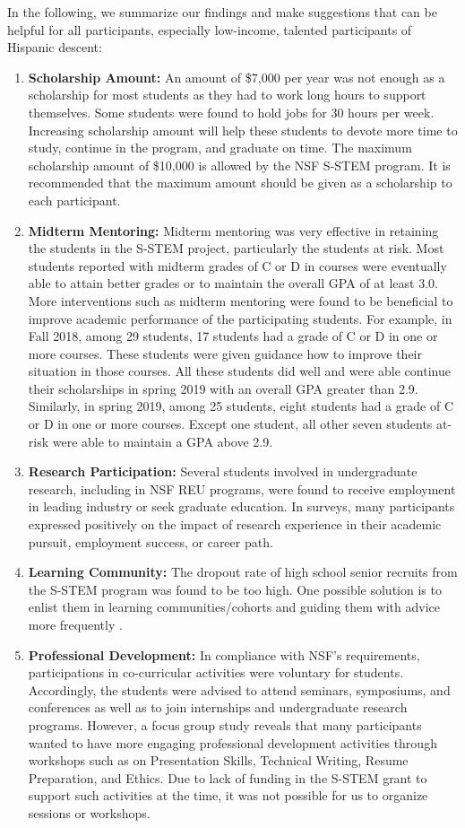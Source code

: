 \documentclass{article}
\begin{document}
In the following, we summarize our findings and make suggestions that can be helpful for all participants, especially low-income, talented participants of Hispanic descent: 
\begin{enumerate}
\item \textbf{Scholarship Amount:} An amount of \$7,000 per year was not enough as a scholarship for most students as they had to work long hours to support themselves. Some students were found to hold jobs for 30 hours per week. Increasing scholarship amount will help these students to devote more time to study, continue in the program, and graduate on time. The maximum scholarship amount of \$10,000 is allowed by the NSF S-STEM program. It is recommended that the maximum amount should be given as a scholarship to each participant.  
\item \textbf{Midterm Mentoring:} Midterm mentoring was very effective in retaining the students in the S-STEM project, particularly the students at risk. Most students reported with midterm grades of C or D in courses were eventually able to attain better grades or to maintain the overall GPA of at least 3.0. More interventions such as midterm mentoring were found to be beneficial to improve academic performance of the participating students. For example, in Fall 2018, among 29 students, 17 students had a grade of C or D in one or more courses. These students were given guidance how to improve their situation in those courses. All these students did well and were able continue their scholarships in spring 2019 with an overall GPA greater than 2.9. Similarly, in spring 2019, among 25 students, eight students had a grade of C or D in one or more courses. Except one student, all other seven students at-risk were able to maintain a GPA above 2.9.
\item \textbf{Research Participation:} Several students involved in undergraduate research, including in NSF REU programs, were found to receive employment in leading industry or seek graduate education.  In surveys, many participants expressed positively on the impact of research experience in their academic pursuit, employment success, or career path.  
\item \textbf{Learning Community:} The dropout rate of high school senior recruits from the S-STEM program was found to be too high. One possible solution is to enlist them in learning communities/cohorts and guiding them with advice more frequently \cite{tinto2002learned, kalevitch2016building}. 
\item \textbf{Professional Development:} In compliance with NSF’s requirements, participations in co-curricular activities were voluntary for students. Accordingly, the students were advised to attend seminars, symposiums, and conferences as well as to join internships and undergraduate research programs. However, a focus group study reveals that many participants wanted to have more engaging professional development activities through workshops such as on Presentation Skills, Technical Writing, Resume Preparation, and Ethics. Due to lack of funding in the S-STEM grant to support such activities at the time, it was not possible for us to organize sessions or workshops. 
\end{enumerate}
\end{document}
